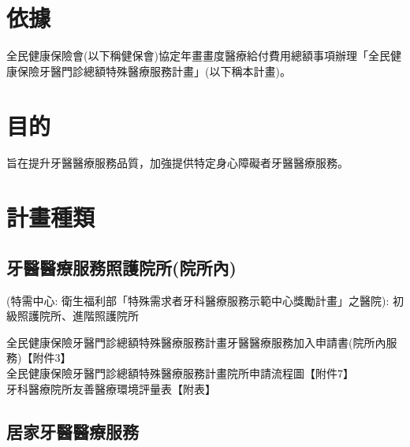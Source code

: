 \section{依據}
全民健康保險會(以下稱健保會)協定年畫畫度醫療給付費用總額事項辦理「全民健康保險牙醫門診總額特殊醫療服務計畫」(以下稱本計畫)。

\section{目的} 旨在提升牙醫醫療服務品質，加強提供特定身心障礙者牙醫醫療服務。

\section{計畫種類}

\subsection{牙醫醫療服務照護院所(院所內)}
(特需中心: 衛生福利部「特殊需求者牙科醫療服務示範中心獎勵計畫」之醫院): 初級照護院所、進階照護院所

全民健康保險牙醫門診總額特殊醫療服務計畫牙醫醫療服務加入申請書(院所內服務)【附件3】\\
全民健康保險牙醫門診總額特殊醫療服務計畫院所申請流程圖【附件7】\\
牙科醫療院所友善醫療環境評量表【附表】




\subsection{居家牙醫醫療服務}

